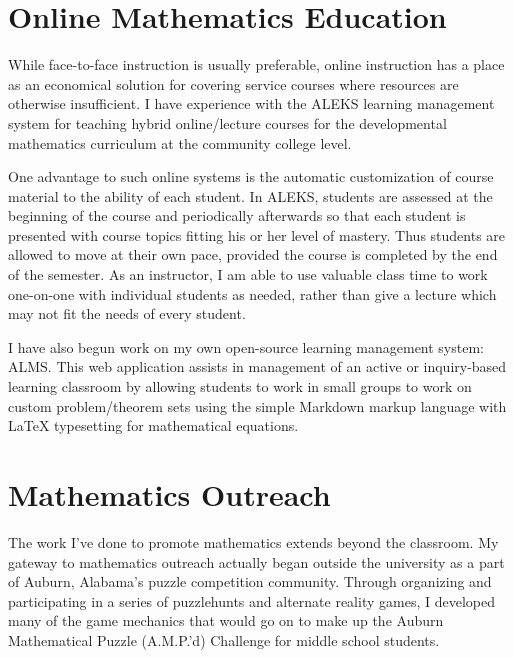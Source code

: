 \documentclass[11pt]{amsart}
\theoremstyle{plain}
\newcommand{\<}{\langle}
\renewcommand{\>}{\rangle}
\begin{document}
\section*{Online Mathematics Education}

While face-to-face instruction is usually preferable, online instruction has
a place as an economical solution for covering service courses where resources
are otherwise insufficient. I have experience with the ALEKS learning management
system for teaching hybrid online/lecture courses for the developmental
mathematics curriculum at the community college level.

One advantage to such online systems is the automatic customization of course
material to the ability of each student. In ALEKS, students are assessed at the
beginning of the course and periodically afterwards so that each student is
presented with course topics fitting his or her level of mastery. Thus students
are allowed to move at their own pace, provided the course is completed by
the end of the semester. As an instructor, I am able to use valuable class time
to work one-on-one with individual students as needed, rather than give
a lecture which may not fit the needs of every student.

I have also begun work on my own open-source learning management system: ALMS.
This web application assists in management of an active or inquiry-based
learning classroom by allowing students to work in small groups to
work on custom problem/theorem sets using the simple Markdown markup
language with \LaTeX{} typesetting for mathematical equations.


\section*{Mathematics Outreach}

The work I've done to promote mathematics extends beyond the classroom. My
gateway to mathematics outreach actually began outside the university as a part
of Auburn, Alabama's puzzle competition community. Through organizing and
participating in a series of puzzlehunts and alternate reality games, I
developed many of the game mechanics that would go on to make up the
Auburn Mathematical Puzzle (A.M.P.'d) Challenge for middle school students.
\end{document}
